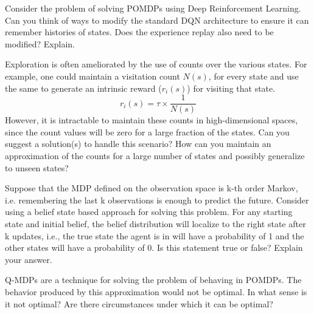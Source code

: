 \documentclass[solution,addpoints,12pt]{exam}
\begin{document}
\begin{questions}
\question[3] Consider the problem of solving POMDPs using Deep Reinforcement Learning. Can you think of ways to modify the standard DQN architecture to ensure it can remember histories of states. Does the experience replay also need to be modified? Explain.

\begin{solution}

\end{solution}


\question[4] Exploration is often ameliorated by the use of counts over the various states. For example, one could maintain a visitation count $N(s)$, for every state and use the same to generate an intrinsic reward ($r_i(s)$) for visiting that state.
\[ r_i(s) = \tau \times \frac{1}{N(s)} \]
However, it is intractable to maintain these counts in high-dimensional spaces, since the count values will be zero for a large fraction of the states. Can you suggest a solution(s) to handle this scenario? How can you maintain an approximation of the counts for a large number of states and possibly generalize to unseen states?

\begin{solution}

\end{solution}

\question[5] Suppose that the MDP defined on the observation space is k-th order Markov, i.e. remembering the last k observations is enough to predict the future. 
Consider using a belief state based approach for solving this problem. For any starting state and initial belief, the belief distribution will localize to the right state after k updates, i.e., the true state the agent is in will have a probability of 1 and the other states will have a probability of 0. Is this statement true or false? Explain your answer. 

\begin{solution}

\end{solution}




\question[3]
Q-MDPs are a technique for solving the problem of behaving in POMDPs. The behavior produced by this approximation would not be optimal. In what sense is it not optimal?  Are there circumstances under which it can be optimal?

\begin{solution}

\end{solution}


\end{questions}
\end{document}
